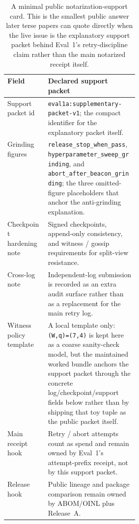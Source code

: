 \documentclass[11pt]{article}
\begin{document}
\begin{table}[t]
\centering
\begin{tabularx}{0.97\linewidth}{@{}>{\raggedright\arraybackslash}p{0.31\linewidth}>{\raggedright\arraybackslash}X@{}}
\toprule
\textbf{Field} & \textbf{Declared support packet} \\
\midrule
Support packet id & \texttt{eval1a:supplementary-packet-v1}; the compact identifier for the explanatory packet itself. \\
Grinding figures & \texttt{release\_stop\_when\_pass}, \texttt{hyperparameter\_sweep\_grinding}, and \texttt{abort\_after\_beacon\_grinding}; the three omitted-figure placeholders that anchor the anti-grinding explanation. \\
Checkpoint hardening note & Signed checkpoints, append-only consistency, and witness / gossip requirements for split-view resistance. \\
Cross-log note & Independent-log submission is recorded as an extra audit surface rather than as a replacement for the main retry log. \\
Witness policy template & A local template only: \texttt{(W,q)=(7,4)} is kept here as a coarse sanity-check model, but the maintained worked bundle anchors the support packet through the concrete log/checkpoint/support fields below rather than by shipping that toy tuple as the public packet itself. \\
Main receipt hook & Retry / abort attempts count as spend and remain owned by Eval~1's attempt-prefix receipt, not by this support packet. \\
Release hook & Public lineage and package comparison remain owned by ABOM/OINL plus Release~A. \\
\bottomrule
\end{tabularx}
\caption{A minimal public notarization-support card. This is the smallest public answer later terse papers can quote directly when the live issue is the explanatory support packet behind Eval~1's retry-discipline claim rather than the main notarized receipt itself.}
\label{tab:eval1a-card}
\end{table}
\end{document}
